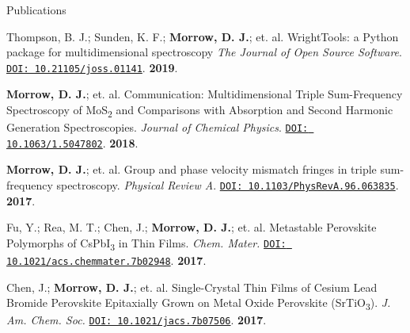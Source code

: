 \documentclass{resume} %
\begin{document}
\begin{rSection}{Publications}
\begin{etaremune}[topsep=0pt,itemsep=0pt,partopsep=0pt,parsep=0pt]
\item Thompson, B. J.; Sunden, K. F.; \textbf{Morrow, D. J.}; et. al. %
WrightTools: a Python package for multidimensional spectroscopy \emph{The Journal of Open Source Software}. 
\href{http://doi.org/10.21105/joss.01141}{\texttt{DOI: 10.21105/joss.01141}}. \textbf{2019}.
	
\item \textbf{Morrow, D. J.}; et. al. %
Communication: Multidimensional Triple Sum-Frequency Spectroscopy of MoS\textsubscript{2} and Comparisons with Absorption and Second Harmonic Generation Spectroscopies. \emph{Journal of Chemical Physics}. \href{http://doi.org/10.1063/1.5047802}{\texttt{DOI: 10.1063/1.5047802}}. \textbf{2018}.
	
\item \textbf{Morrow, D. J.}; et. al. %
Group and phase velocity mismatch fringes in triple sum-frequency spectroscopy. \emph{Physical Review A}. \href{https://journals.aps.org/pra/abstract/10.1103/PhysRevA.96.063835}{\texttt{DOI: 10.1103/PhysRevA.96.063835}}. \textbf{2017}.

\item Fu, Y.; Rea, M. T.; Chen, J.; \textbf{Morrow, D. J.}; et. al. %
Metastable Perovskite Polymorphs of CsPbI\textsubscript{3} in Thin Films. \emph{Chem. Mater.} \href{http://pubs.acs.org/doi/10.1021/acs.chemmater.7b02948}{\texttt{DOI: 10.1021/acs.chemmater.7b02948}}. \textbf{2017}. 
 
\item Chen, J.; \textbf{Morrow, D. J.}; et. al. %
Single-Crystal Thin Films of Cesium Lead Bromide Perovskite Epitaxially Grown on Metal Oxide Perovskite (SrTiO\textsubscript{3}). \emph{J. Am. Chem. Soc.} \href{http://pubs.acs.org/doi/10.1021/jacs.7b07506}{\texttt{DOI: 10.1021/jacs.7b07506}}. \textbf{2017}. 
	



\end{etaremune}

\end{rSection}
\end{document}
